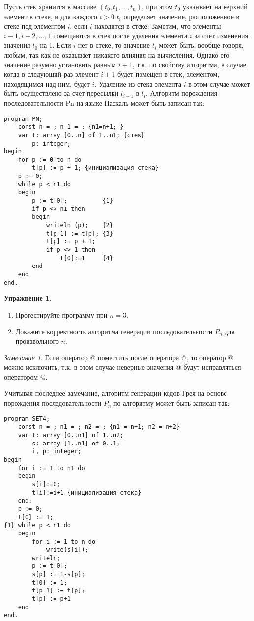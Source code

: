 \documentclass[12pt,a4paper]{article}
\theoremstyle{plain}
\theoremstyle{definition}
\newtheorem*{task}{Упражнение}
\theoremstyle{remark}
\newtheorem*{remark}{Замечание}
\begin{document}
Пусть стек хранится в массиве $(t_0,t_1,\ldots,t_n)$, при этом $t_0$ указывает на верхний элемент в стеке, и для каждого $i>0$ $t_i$ определяет значение, расположенное в стеке под элементом $i$, если $i$ находится в стеке. Заметим, что элементы $i-1,i-2,\ldots,1$ помещаются в стек после удаления элемента $i$ за счет изменения значения $t_0$ на 1. Если $i$ нет в стеке, то значение $t_i$ может быть, вообще говоря, любым, так как не оказывает никакого влияния на вычисления. Однако его значение разумно установить равным $i+1$, т.к. по свойству алгоритма, в случае когда в следующий раз элемент $i+1$ будет помещен в стек, элементом, находящимся над ним, будет $i$. Удаление из стека элемента $i$ в этом случае может быть осуществлено за счет пересылки $t_{i-1}$ в $t_i$. Алгоритм порождения последовательности Pn на языке Паскаль может быть записан так:

\begin{verbatim}
program PN;
    const n = ; n 1 = ; {n1=n+1; }
    var t: array [0..n] of 1..n1; {стек}
        p: integer;
begin
    for p := 0 to n do
        t[p] := p + 1; {инициализация стека}
    p := 0;
    while p < n1 do
    begin
        p := t[0];          {1}
        if p <> n1 then
        begin
            writeln (p);    {2}
            t[p-1] := t[p]; {3}
            t[p] := p + 1;
            if p <> 1 then
                t[0]:=1     {4}
        end
    end
end.
\end{verbatim}

\begin{task}
~\\
\begin{enumerate}
\item Протестируйте программу \verb@PN@ при $n=3$.
\item Докажите корректность алгоритма генерации последовательности $P_n$ для произвольного $n$.
\end{enumerate}
\end{task}

\begin{remark}
Если оператор @ поместить после оператора @, то оператор @ можно исключить, т.к. в этом случае неверные значения \verb@t[0]@ будут исправляться оператором @.
\end{remark}

Учитывая последнее замечание, алгоритм генерации кодов Грея на основе порождения последовательности $P_n$ по алгоритму \verb@PN@ может быть записан так:

\begin{verbatim}
program SET4;
    const n = ; n1 = ; n2 = ; {n1 = n+1; n2 = n+2}
    var t: array [0..n1] of 1..n2;
        s: array [1..n1] of 0..1;
        i, p: integer;
begin
    for i := 1 to n1 do
    begin
        s[i]:=0;
        t[i]:=i+1 {инициализация стека}
    end;
    p := 0;
    t[0] := 1;
{1} while p < n1 do
    begin
        for i := 1 to n do
            write(s[i]);
        writeln;
        p := t[0];
        s[p] := 1-s[p];
        t[0] := 1;
        t[p-1] := t[p];
        t[p] := p+1
    end
end.
\end{verbatim}
\end{document}
